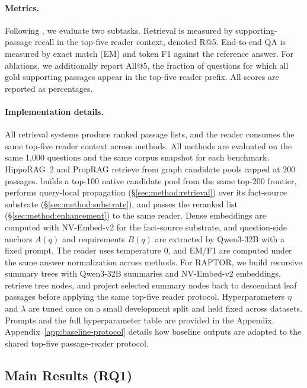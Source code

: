 \paragraph{Metrics.}
Following \citet{gutierrez2025hipporag}, we evaluate two subtasks.
Retrieval is measured by supporting-passage recall in the top-five
reader context, denoted R@5. End-to-end QA is measured by exact match
(EM) and token F1 against the reference answer. For ablations, we
additionally report All@5, the fraction of questions for which all
gold supporting passages appear in the top-five reader prefix. All
scores are reported as percentages.

\paragraph{Implementation details.}
All retrieval systems produce ranked passage lists, and the reader
consumes the same top-five reader context across methods. All methods
are evaluated on the same 1{,}000 questions and the same corpus
snapshot for each benchmark. HippoRAG~2 and PropRAG retrieve from graph
candidate pools capped at 200 passages.
\methodname{} builds a top-100 native candidate pool from the same
top-200 frontier, performs query-local propagation
(\S\ref{sec:method:retrieval}) over its fact-source substrate
(\S\ref{sec:method:substrate}), and passes the reranked list
(\S\ref{sec:method:enhancement}) to the same reader. Dense embeddings
are computed with NV-Embed-v2 for the fact-source substrate, and
question-side anchors $A(q)$ and requirements $B(q)$ are extracted by
Qwen3-32B with a fixed prompt. The reader uses temperature 0, and
EM/F1 are computed under the same answer normalization across methods.
For RAPTOR, we build recursive summary trees with Qwen3-32B summaries
and NV-Embed-v2 embeddings, retrieve tree nodes, and project selected
summary nodes back to descendant leaf passages before applying the same
top-five reader protocol.
Hyperparameters $\eta$ and $\lambda$ are tuned once on a small
development split and held fixed across datasets. Prompts and the full
hyperparameter table are provided in the Appendix.
Appendix~\ref{app:baseline-protocol} details how baseline outputs are
adapted to the shared top-five passage-reader protocol.

\subsection{Main Results (RQ1)}
\label{sec:experiments:main}

